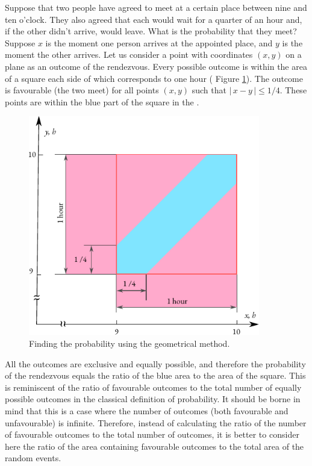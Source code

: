 Suppose that two people have agreed to meet at a certain place between
nine and ten o'clock. They also agreed that each would wait for a
quarter of an hour and, if the other didn't arrive, would leave. What
is the probability that they meet?  Suppose $x$ is the moment one
person arrives at the appointed place, and $y$ is the moment the other
arrives. Let us consider a point with coordinates $(x, y)$ on a plane
as an outcome of the rendezvous. Every possible outcome is within the
area of a square each side of which corresponds to one hour ( Figure
\ref{prob-meeting}). The outcome is favourable (the two meet) for all
points $(x, y)$ such that $\vert \, x - y \, \vert \le 1/4$. These
points are within the blue part of the square in the . 
  
  \begin{figure}[ht]
 \centering
 \includegraphics[width=0.9\textwidth]{figures/prob-meeting.pdf}
\caption{Finding the probability using the geometrical method.\label{prob-meeting}}
 \end{figure}
  
  All the outcomes are exclusive
and equally possible, and therefore the probability of the rendezvous
equals the ratio of the blue area to the area of the square. This
is reminiscent of the ratio of favourable outcomes to the total number
of equally possible outcomes in the classical definition of
probability. It should be borne in mind that this is a case where the
number of outcomes (both favourable and unfavourable) is
infinite. Therefore, instead of calculating the ratio of the number of
favourable outcomes to the total number of outcomes, it is better to
consider here the ratio of the area containing favourable outcomes to
the total area of the random events.




